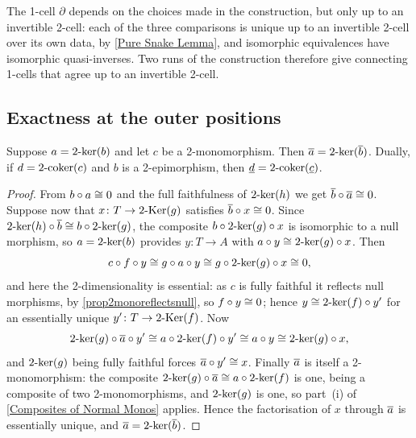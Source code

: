\begin{remark}
  \label{Rem Partial Choices}
  The 1-cell \(\partial\) depends on the choices made in the construction, but only up to an invertible 2-cell: each of the three comparisons is unique up to an invertible 2-cell over its own data, by \lemx\ref{Pure Snake Lemma}, and isomorphic equivalences have isomorphic quasi-inverses. Two runs of the construction therefore give connecting 1-cells that agree up to an invertible 2-cell.
\end{remark}

\subsection{Exactness at the outer positions}\label{SS:OuterExactness}

\begin{proposition}
  \label{P:KerBarA}   \leanok
  Suppose \(a=2\text{-}\mathrm{ker}(b)\) and let \(c\) be a 2-monomorphism. Then \(\overline{a}=2\text{-}\mathrm{ker}(\overline{b})\). Dually, if \(d=2\text{-}\mathrm{coker}(c)\) and \(b\) is a 2-epimorphism, then \(\underline{d}=2\text{-}\mathrm{coker}(\underline{c})\).
\end{proposition}

\begin{proof}
  \leanok
  From \(b\circ a\cong 0\) and the full faithfulness of \(2\text{-}\mathrm{ker}(h)\) we get \(\overline{b}\circ\overline{a}\cong 0\). Suppose now that \(x\colon T\to2\text{-}\mathrm{Ker}(g)\) satisfies \(\overline{b}\circ x\cong 0\). Since \(2\text{-}\mathrm{ker}(h)\circ\overline{b}\cong b\circ2\text{-}\mathrm{ker}(g)\), the composite \(b\circ2\text{-}\mathrm{ker}(g)\circ x\) is isomorphic to a null morphism, so \(a=2\text{-}\mathrm{ker}(b)\) provides \(y\colon T\to A\) with \(a\circ y\cong2\text{-}\mathrm{ker}(g)\circ x\). Then
	\[
		c\circ f\circ y\cong g\circ a\circ y\cong g\circ2\text{-}\mathrm{ker}(g)\circ x\cong 0\text{,}
	\]
	and here the 2-dimensionality is essential: as \(c\) is fully faithful it reflects null morphisms, by \prox\ref{prop2monoreflectsnull}, so \(f\circ y\cong 0\); hence \(y\cong2\text{-}\mathrm{ker}(f)\circ y'\) for an essentially unique \(y'\colon T\to2\text{-}\mathrm{Ker}(f)\). Now
	\[
		2\text{-}\mathrm{ker}(g)\circ\overline{a}\circ y'\cong a\circ2\text{-}\mathrm{ker}(f)\circ y'\cong a\circ y\cong2\text{-}\mathrm{ker}(g)\circ x\text{,}
	\]
	and \(2\text{-}\mathrm{ker}(g)\) being fully faithful forces \(\overline{a}\circ y'\cong x\). Finally \(\overline{a}\) is itself a 2-monomorphism: the composite \(2\text{-}\mathrm{ker}(g)\circ\overline{a}\cong a\circ2\text{-}\mathrm{ker}(f)\) is one, being a composite of two 2-monomorphisms, and \(2\text{-}\mathrm{ker}(g)\) is one, so part~\textup{(i)} of \prox\ref{Composites of Normal Monos} applies. Hence the factorisation of \(x\) through \(\overline{a}\) is essentially unique, and \(\overline{a}=2\text{-}\mathrm{ker}(\overline{b})\).
\end{proof}

